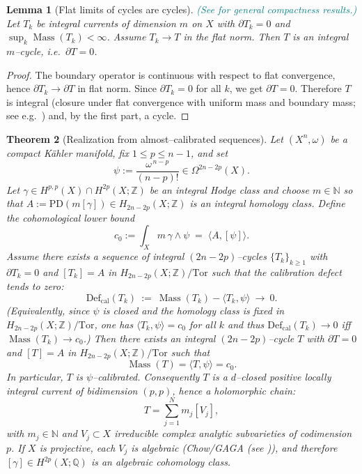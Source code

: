 \documentclass[11pt]{article}
\newcommand{\REV}[1]{\textcolor{blue}{#1}}
\newcommand{\REVMZ}[1]{\textcolor{teal}{#1}}  %
\numberwithin{equation}{section}  %
\theoremstyle{plain}
\newtheorem{theorem}{Theorem}[section]
\newtheorem{lemma}[theorem]{Lemma}
\theoremstyle{definition}
\theoremstyle{remark}
\newcommand{\Z}{\mathbb{Z}}
\newcommand{\Q}{\mathbb{Q}}
\newcommand{\N}{\mathbb{N}}
\DeclareMathOperator{\Mass}{Mass}
\newcommand{\Def}{\mathrm{Def}}
\begin{document}
\begin{lemma}[Flat limits of cycles are cycles]\label{lem:flat_limit_of_cycles_is_cycle}
\label{lem:cone-closed-seq}
\label{lem:flat-compactness-setup}
\REVMZ{(See \cite{Fed69,Sim83} for general compactness results.)}
Let $T_k$ be integral currents of dimension $m$ on $X$ with $\partial T_k=0$ and
$\sup_k\Mass(T_k)<\infty$.  Assume $T_k\to T$ in the flat norm.  Then $T$ is an
integral $m$--cycle, i.e.\ $\partial T=0$.
\end{lemma}
\begin{proof}
The boundary operator is continuous with respect to flat convergence, hence
$\partial T_k\to \partial T$ in flat norm.  Since $\partial T_k=0$ for all $k$, we get
$\partial T=0$.
Therefore $T$ is integral (closure under flat convergence with uniform mass and boundary mass; see e.g.\ \cite[\S4.2]{Fed69}) and, by the first part, a cycle.
\end{proof}


\begin{theorem}[Realization from almost--calibrated sequences]\label{thm:realization-from-almost}
\label{thm:cone-closed-FF}
Let $(X^n,\omega)$ be a compact K\"ahler manifold, fix $1\le p\le n-1$, and set
\[
\psi := \frac{\omega^{\,n-p}}{(n-p)!}\in \Omega^{2n-2p}(X).
\]
Let $\gamma\in H^{p,p}(X)\cap H^{2p}(X;\Z)$ be an integral Hodge class and choose $m\in\N$
so that $A:=\mathrm{PD}(m[\gamma])\in H_{2n-2p}(X;\Z)$ is an integral homology class.
Define the cohomological lower bound
\[
c_0 := \int_X m\,\gamma\wedge \psi \;=\; \langle A,[\psi]\rangle .
\]
Assume there exists a sequence of integral $(2n-2p)$--cycles $\{T_k\}_{k\ge 1}$ with
$\partial T_k=0$ and $[T_k]=A$ in $H_{2n-2p}(X;\Z)/\mathrm{Tor}$ such that the calibration defect tends to zero:
\[
\Def_{\mathrm{cal}}(T_k)\ :=\ \Mass(T_k)-\langle T_k,\psi\rangle \ \longrightarrow\ 0.
\]
(Equivalently, since $\psi$ is closed and the homology class is fixed in $H_{2n-2p}(X;\Z)/\mathrm{Tor}$, one has $\langle T_k,\psi\rangle=c_0$ for all $k$ and thus
$\Def_{\mathrm{cal}}(T_k)\to 0$ iff $\Mass(T_k)\to c_0$.)
Then there exists an integral $(2n-2p)$--cycle $T$ with $\partial T=0$ and $[T]=A$ in $H_{2n-2p}(X;\Z)/\mathrm{Tor}$ such that
\[
\Mass(T)=\langle T,\psi\rangle=c_0.
\]
In particular, $T$ is $\psi$--calibrated.  Consequently $T$ is a $d$--closed positive locally integral current of bidimension $(p,p)$,
hence a holomorphic chain:
\[
T=\sum_{j=1}^N m_j [V_j],
\]
with $m_j\in\mathbb{N}$ and $V_j\subset X$ irreducible complex analytic subvarieties of codimension $p$.
If $X$ is projective, each $V_j$ is algebraic (Chow/GAGA (see \REV{\cite{Hartshorne77,GH78,Serre56}})), and therefore $[\gamma]\in H^{2p}(X;\Q)$ is an
algebraic cohomology class.
\end{theorem}
\end{document}

